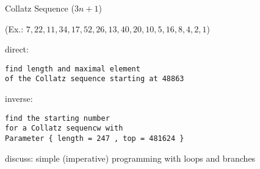 \begin{slide}{Collatz Sequence ($3n+1$)}

(Ex.: $7, 22, 11, 34, 17, 52, 26, 13, 40, 20, 10, 5, 16, 8, 4, 2, 1$)

direct:
\begin{verbatim}
find length and maximal element 
of the Collatz sequence starting at 48863
\end{verbatim}

inverse:
\begin{verbatim}
find the starting number
for a Collatz sequencw with
Parameter { length = 247 , top = 481624 }
\end{verbatim}

discuss: simple (imperative) programming
with loops and branches

\end{slide}
